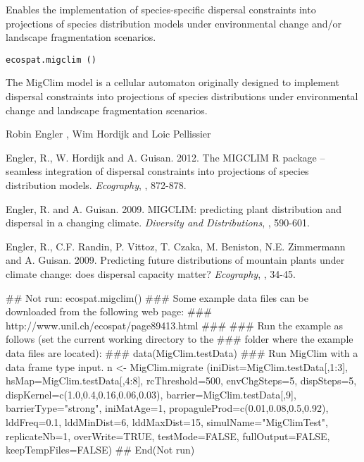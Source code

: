 \documentclass[a4paper]{book}
\begin{document}
%
\begin{Description}\relax
Enables the implementation of species-specific dispersal constraints into projections of species distribution models under environmental change and/or landscape fragmentation scenarios.
\end{Description}
%
\begin{Usage}
\begin{verbatim}
ecospat.migclim ()
\end{verbatim}
\end{Usage}
%
\begin{Details}\relax
The MigClim model is a cellular automaton originally designed to implement dispersal constraints into projections of species distributions under environmental change and landscape fragmentation scenarios.
\end{Details}
%
\begin{Author}\relax
Robin Engler , Wim Hordijk  and Loic Pellissier 
\end{Author}
%
\begin{References}\relax
Engler, R., W. Hordijk and A. Guisan. 2012. The MIGCLIM R package -- seamless integration of dispersal constraints into projections of species distribution models. \emph{Ecography}, , 872-878.

Engler, R. and A. Guisan. 2009. MIGCLIM: predicting plant distribution and dispersal in a changing climate. \emph{Diversity and Distributions}, , 590-601.

Engler, R., C.F. Randin, P. Vittoz, T. Czaka, M. Beniston, N.E. Zimmermann and A. Guisan. 2009. Predicting future distributions of mountain plants under climate change: does dispersal capacity matter? \emph{Ecography}, , 34-45.
\end{References}
%
\begin{Examples}
\begin{ExampleCode}
## Not run: 
ecospat.migclim()
### Some example data files can be downloaded from the following web page:
### http://www.unil.ch/ecospat/page89413.html
###
### Run the example as follows (set the current working directory to the
### folder where the example data files are located):
###
data(MigClim.testData)
### Run MigClim with a data frame type input.
n <- MigClim.migrate (iniDist=MigClim.testData[,1:3],
hsMap=MigClim.testData[,4:8], rcThreshold=500,
envChgSteps=5, dispSteps=5, dispKernel=c(1.0,0.4,0.16,0.06,0.03),
barrier=MigClim.testData[,9], barrierType="strong",
iniMatAge=1, propaguleProd=c(0.01,0.08,0.5,0.92),
lddFreq=0.1, lddMinDist=6, lddMaxDist=15,
simulName="MigClimTest", replicateNb=1, overWrite=TRUE,
testMode=FALSE, fullOutput=FALSE, keepTempFiles=FALSE)
## End(Not run)

\end{ExampleCode}
\end{Examples}
\end{document}
